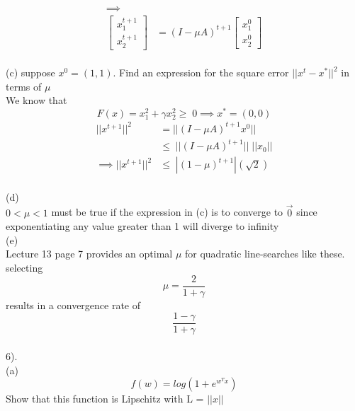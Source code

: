 \documentclass[12pt,letterpaper]{article}
\begin{document}
\begin{equation*}
    \begin{split}
    \implies
    \\
\begin{bmatrix}
x^{t+1}_1
\\
x^{t+1}_2
\end{bmatrix}  &= (I -\mu A)^{t+1} \begin{bmatrix}
        x_1^0
        \\
        x_2^0
        \end{bmatrix}
    \end{split}
\end{equation*}
\vspace{10pt}
\\
(c) suppose $x^0 = (1,1)$. Find an expression for the square error $|| x^t - x^*||^2$ in terms of $\mu$ 
\vspace{10pt}\\
We know that \[F(x) = x_1^2 + \gamma x_2^2 \ge\; 0 \implies x^* = (0,0)\]
\begin{equation*}
    \begin{split}
        ||x^{t+1}||^2 &= ||(I-\mu A)^{t+1} x^0||
        \\
        &\le\; ||(I - \mu A)^{t+1}||\;||x_0||
        \\
        \implies ||x^{t+1}||^2 &\le\; |(1-\mu)^{t+1}|(\sqrt{2})
    \end{split}
\end{equation*}
\vspace{10pt}
\\
(d)
\vspace{10pt}\\
$0 < \mu < 1$ must be true if the expression in (c) is to converge to $\Vec{0}$ since exponentiating any value greater than 1 will diverge to infinity
\vspace{10pt}
\\
(e)
\vspace{10pt}\\
Lecture 13 page 7 provides an optimal $\mu$ for quadratic line-searches like these.
\\
selecting  \[ \mu = \frac{2}{1 + \gamma}\]
results in a convergence rate of \[ \frac{1 - \gamma }{ 1 + \gamma} \]
\vspace{10pt}
\\
6).
\vspace{10pt}
\\
(a) 
\[f(w) = log(1+e^{w^T x}) \]
Show that this function is Lipschitz with L = $||x||$
\end{document}
